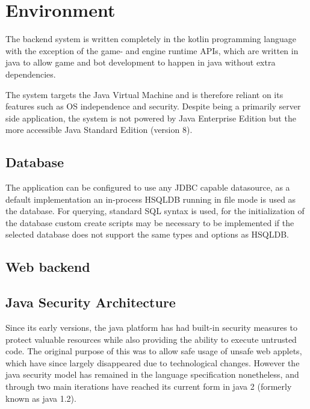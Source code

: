 \documentclass[11pt,a4paper,oneside]{report}
\begin{document}
\chapter{Environment}\label{sect:Environment}

The backend system is written completely in the kotlin programming language with the exception of the game- and engine runtime APIs, which are written in java to allow game and bot development to happen in java without extra dependencies.

The system targets the Java Virtual Machine and is therefore reliant on its features such as OS independence and security. Despite being a primarily server side application, the system is not powered by Java Enterprise Edition but the more accessible Java Standard Edition (version 8).

	\section{Database}
 
 	The application can be configured to use any JDBC capable datasource, as a default implementation an in-process HSQLDB running in file mode is used as the database. For querying, standard SQL syntax is used, for the initialization of the database custom create scripts may be necessary to be implemented if the selected database does not support the same types and options as HSQLDB.

	\section{Web backend}
	
	

	\section{Java Security Architecture}
	
	Since its early versions, the java platform has had built-in security measures to protect valuable resources while also providing the ability to execute untrusted code. The original purpose of this was to allow safe usage of unsafe web applets, which have since largely disappeared due to technological changes. However the java security model has remained in the language specification nonetheless, and through two main iterations have reached its current form in java 2 (formerly known as java 1.2).
	
\end{document}
